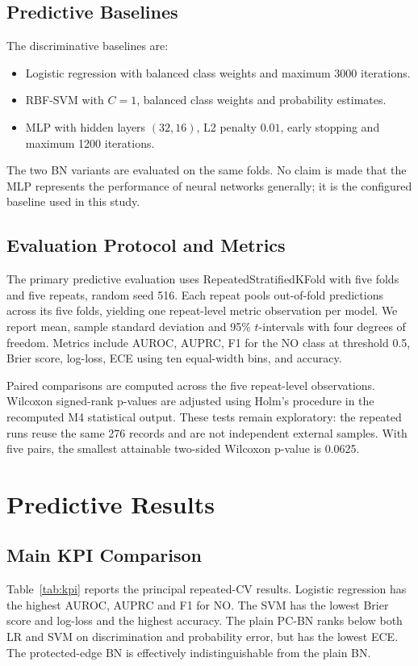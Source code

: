 \documentclass[conference]{IEEEtran}
\begin{document}
\subsection{Predictive Baselines}
The discriminative baselines are:
\begin{itemize}
\item Logistic regression with balanced class weights and maximum 3000 iterations.
\item RBF-SVM with $C=1$, balanced class weights and probability estimates.
\item MLP with hidden layers $(32,16)$, L2 penalty $0.01$, early stopping and maximum 1200 iterations.
\end{itemize}
The two BN variants are evaluated on the same folds. No claim is made that the MLP represents the performance of neural networks generally; it is the configured baseline used in this study.

\subsection{Evaluation Protocol and Metrics}
The primary predictive evaluation uses RepeatedStratifiedKFold with five folds and five repeats, random seed 516. Each repeat pools out-of-fold predictions across its five folds, yielding one repeat-level metric observation per model. We report mean, sample standard deviation and 95\% $t$-intervals with four degrees of freedom. Metrics include AUROC, AUPRC, F1 for the NO class at threshold 0.5, Brier score, log-loss, ECE using ten equal-width bins, and accuracy.

Paired comparisons are computed across the five repeat-level observations. Wilcoxon signed-rank p-values are adjusted using Holm's procedure in the recomputed M4 statistical output. These tests remain exploratory: the repeated runs reuse the same 276 records and are not independent external samples. With five pairs, the smallest attainable two-sided Wilcoxon p-value is 0.0625.

\section{Predictive Results}
\subsection{Main KPI Comparison}
Table~\ref{tab:kpi} reports the principal repeated-CV results. Logistic regression has the highest AUROC, AUPRC and F1 for NO. The SVM has the lowest Brier score and log-loss and the highest accuracy. The plain PC-BN ranks below both LR and SVM on discrimination and probability error, but has the lowest ECE. The protected-edge BN is effectively indistinguishable from the plain BN.
\end{document}
